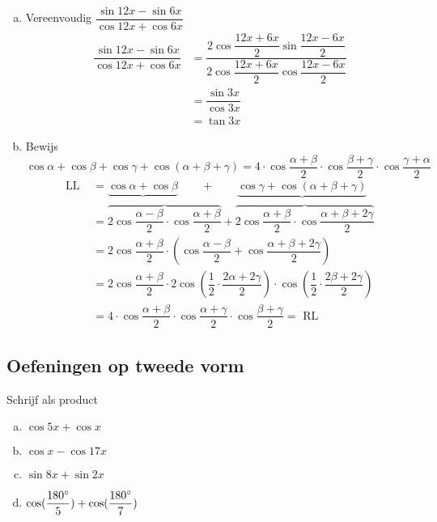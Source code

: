 \documentclass[twoside,a4paper,12pt]{article}
\begin{document}
\begin{enumerate}[(a)]
  \item Vereenvoudig $\dfrac{\sin 12x - \sin 6x}{\cos 12x + \cos 6x}$
  \begin{align*}
    \dfrac{\sin 12x - \sin 6x}{\cos 12x + \cos 6x} &= \dfrac{2\cos \dfrac{12x + 6x}{2} \sin \dfrac{12x - 6x}{2}}{2\cos \dfrac{12x + 6x}{2} \cos \dfrac{12x - 6x}{2}}\\
                                                   &= \dfrac{\sin 3x}{\cos 3x}\\
                                                   &= \tan 3x
  \end{align*}
  \item Bewijs $\cos\alpha + \cos\beta + \cos\gamma + \cos(\alpha + \beta + \gamma)=4\cdot \cos\dfrac{\alpha+\beta}{2} \cdot \cos\dfrac{\beta+\gamma}{2} \cdot \cos\dfrac{\gamma+\alpha}{2}$
  \begin{align*}
    \mbox{LL } &= \underbrace{\cos\alpha + \cos\beta} \qquad + \qquad \underbrace{\cos\gamma + \cos(\alpha + \beta + \gamma)}\\
               &= \overbrace{2\cos\dfrac{\alpha-\beta}{2}\cdot\cos\dfrac{\alpha+\beta}{2}} + \overbrace{2\cos\dfrac{\alpha+\beta}{2}\cdot\cos\dfrac{\alpha+\beta+2\gamma}{2}}\\
               &= 2 \cos\dfrac{\alpha+\beta}{2}\cdot\left(\cos\dfrac{\alpha-\beta}{2} + \cos\dfrac{\alpha+\beta+2\gamma}{2}\right)\\
               &= 2 \cos\dfrac{\alpha+\beta}{2} \cdot 2 \cos\left(\dfrac{1}{2}\cdot\dfrac{2\alpha+2\gamma}{2}\right) \cdot \cos\left(\dfrac{1}{2}\cdot\dfrac{2\beta+2\gamma}{2}\right)\\
               &= 4\cdot \cos\dfrac{\alpha+\beta}{2} \cdot \cos\dfrac{\alpha+\gamma}{2} \cdot \cos\dfrac{\beta + \gamma}{2} = \mbox{ RL}
  \end{align*}
\end{enumerate}

\subsection{Oefeningen op tweede vorm}

\begin{oefening}
Schrijf als product
\begin{enumerate}[(a)]
\itemsep.5em
  \item $\cos5x+\cos x$
  \item $\cos x-\cos17x$
  \item $\sin8x+\sin2x$
  \item $\cos(\dfrac{180^\circ}{5})+\cos(\dfrac{180^\circ}{7})$
\end{enumerate}
\end{oefening}
\end{document}
